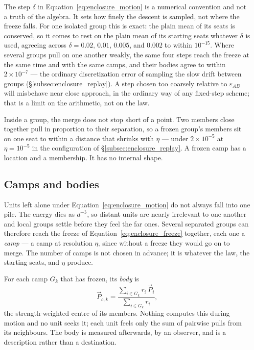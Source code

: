 \documentclass[12pt, a4paper]{article}
\begin{document}
The step $\delta$ in Equation~\eqref{eq:enclosure_motion} is a
numerical convention and not a truth of the algebra. It sets how
finely the descent is sampled, not where the freeze falls. For one
isolated group this is exact: the plain mean of its seats is
conserved, so it comes to rest on the plain mean of its starting
seats whatever $\delta$ is used, agreeing across
$\delta = 0.02$, $0.01$, $0.005$, and $0.002$ to within
$10^{-15}$. Where several groups pull on one another weakly, the
same four steps reach the freeze at the same time and with the same
camps, and their bodies agree to within $2\times10^{-7}$ --- the
ordinary discretization error of sampling the slow drift between
groups (\S\ref{subsec:enclosure_replay}). A step chosen too coarsely
relative to $\varepsilon_{AB}$ will misbehave near close approach,
in the ordinary way of any fixed-step scheme; that is a limit on the
arithmetic, not on the law.

Inside a group, the merge does not stop short of a point. Two
members close together pull in proportion to their separation, so a
frozen group's members sit on one seat to within a distance that
shrinks with $\eta$ --- under $2\times10^{-5}$ at $\eta=10^{-5}$ in
the configuration of \S\ref{subsec:enclosure_replay}. A frozen camp
has a location and a membership. It has no internal shape.

\subsection{Camps and bodies}
\label{subsec:enclosure_camps}
Units left alone under Equation~\eqref{eq:enclosure_motion} do not
always fall into one pile. The energy dies as $d^{-3}$, so distant
units are nearly irrelevant to one another and local groups settle
before they feel the far ones. Several separated groups can
therefore reach the freeze of Equation~\eqref{eq:enclosure_freeze}
together, each one a \emph{camp} --- a camp at resolution $\eta$,
since without a freeze they would go on to merge. The number of
camps is not chosen in advance; it is whatever the law, the starting
seats, and $\eta$ produce.

For each camp $G_k$ that has frozen, its \emph{body} is
\begin{equation}
    \vec P_{c,k}
    = \frac{\sum_{i\in G_k} r_i\,\vec P_i}{\sum_{i\in G_k} r_i},
    \label{eq:enclosure_body}
\end{equation}
the strength-weighted centre of its members. Nothing computes this
during motion and no unit seeks it; each unit feels only the sum of
pairwise pulls from its neighbours. The body is measured afterwards,
by an observer, and is a description rather than a destination.
\end{document}

